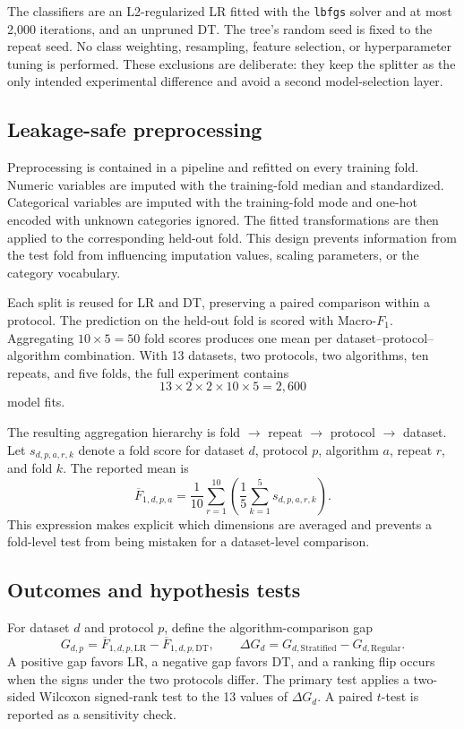 \documentclass[twoside,11pt]{article}
\newcommand{\macrof}{Macro-$F_1$}
\newcommand{\gap}{G}
\newcommand{\deltag}{\Delta G}
\begin{document}
The classifiers are an L2-regularized LR fitted with the \texttt{lbfgs} solver and at most 2,000 iterations, and an unpruned DT. The tree's random seed is fixed to the repeat seed. No class weighting, resampling, feature selection, or hyperparameter tuning is performed. These exclusions are deliberate: they keep the splitter as the only intended experimental difference and avoid a second model-selection layer.

\subsection{Leakage-safe preprocessing}
Preprocessing is contained in a pipeline and refitted on every training fold. Numeric variables are imputed with the training-fold median and standardized. Categorical variables are imputed with the training-fold mode and one-hot encoded with unknown categories ignored. The fitted transformations are then applied to the corresponding held-out fold. This design prevents information from the test fold from influencing imputation values, scaling parameters, or the category vocabulary.

Each split is reused for LR and DT, preserving a paired comparison within a protocol. The prediction on the held-out fold is scored with \macrof. Aggregating $10\times5=50$ fold scores produces one mean per dataset--protocol--algorithm combination. With 13 datasets, two protocols, two algorithms, ten repeats, and five folds, the full experiment contains
\begin{equation}
13\times2\times2\times10\times5=2{,}600
\end{equation}
model fits.

The resulting aggregation hierarchy is fold $\rightarrow$ repeat $\rightarrow$ protocol $\rightarrow$ dataset. Let $s_{d,p,a,r,k}$ denote a fold score for dataset $d$, protocol $p$, algorithm $a$, repeat $r$, and fold $k$. The reported mean is
\begin{equation}
\overline{F}_{1,d,p,a}=\frac{1}{10}\sum_{r=1}^{10}\left(\frac{1}{5}\sum_{k=1}^{5}s_{d,p,a,r,k}\right).
\end{equation}
This expression makes explicit which dimensions are averaged and prevents a fold-level test from being mistaken for a dataset-level comparison.

\subsection{Outcomes and hypothesis tests}
For dataset $d$ and protocol $p$, define the algorithm-comparison gap
\begin{equation}
\gap_{d,p}=\overline{F}_{1,d,p,\mathrm{LR}}-\overline{F}_{1,d,p,\mathrm{DT}},
\qquad
\deltag_d=\gap_{d,\mathrm{Stratified}}-\gap_{d,\mathrm{Regular}}.
\end{equation}
A positive gap favors LR, a negative gap favors DT, and a ranking flip occurs when the signs under the two protocols differ. The primary test applies a two-sided Wilcoxon signed-rank test to the 13 values of $\deltag_d$. A paired $t$-test is reported as a sensitivity check.
\end{document}
